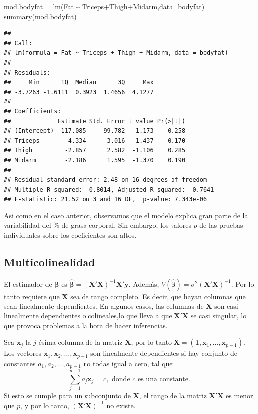 \documentclass[
]{article}
\newenvironment{Shaded}{\begin{snugshade}}{\end{snugshade}}
\newcommand{\AttributeTok}[1]{\textcolor[rgb]{0.77,0.63,0.00}{#1}}
\newcommand{\FunctionTok}[1]{\textcolor[rgb]{0.00,0.00,0.00}{#1}}
\newcommand{\NormalTok}[1]{#1}
\newcommand{\OtherTok}[1]{\textcolor[rgb]{0.56,0.35,0.01}{#1}}
\newcommand{\SpecialCharTok}[1]{\textcolor[rgb]{0.00,0.00,0.00}{#1}}
\begin{document}
\begin{Shaded}
\begin{Highlighting}[]
\NormalTok{mod.bodyfat }\OtherTok{=} \FunctionTok{lm}\NormalTok{(Fat }\SpecialCharTok{\textasciitilde{}}\NormalTok{ Triceps}\SpecialCharTok{+}\NormalTok{Thigh}\SpecialCharTok{+}\NormalTok{Midarm,}\AttributeTok{data=}\NormalTok{bodyfat)}
\FunctionTok{summary}\NormalTok{(mod.bodyfat)}
\end{Highlighting}
\end{Shaded}

\begin{verbatim}
## 
## Call:
## lm(formula = Fat ~ Triceps + Thigh + Midarm, data = bodyfat)
## 
## Residuals:
##     Min      1Q  Median      3Q     Max 
## -3.7263 -1.6111  0.3923  1.4656  4.1277 
## 
## Coefficients:
##             Estimate Std. Error t value Pr(>|t|)
## (Intercept)  117.085     99.782   1.173    0.258
## Triceps        4.334      3.016   1.437    0.170
## Thigh         -2.857      2.582  -1.106    0.285
## Midarm        -2.186      1.595  -1.370    0.190
## 
## Residual standard error: 2.48 on 16 degrees of freedom
## Multiple R-squared:  0.8014, Adjusted R-squared:  0.7641 
## F-statistic: 21.52 on 3 and 16 DF,  p-value: 7.343e-06
\end{verbatim}

Asi como en el caso anterior, observamos que el modelo explica gran parte de la variabilidad del \% de grasa corporal. Sin embargo, los valores \(p\) de las pruebas individuales sobre los coeficientes son altos.

\hypertarget{multicolinealidad-1}{%
\subsection{Multicolinealidad}\label{multicolinealidad-1}}

El estimador de \(\boldsymbol \beta\) es \(\widehat{\boldsymbol \beta}= (\boldsymbol X'\boldsymbol X)^{-1}\boldsymbol X'\boldsymbol y\). Además, \(V(\widehat{\boldsymbol \beta}) = \sigma^{2}(\boldsymbol X'\boldsymbol X)^{-1}\). Por lo tanto requiere que \(\boldsymbol X\) sea de rango completo. Es decir, que hayan columnas que sean linealmente dependientes. En algunos casos, las columnas de \(\boldsymbol X\) son casi linealmente dependientes o colineales,lo que lleva a que \(\boldsymbol X'\boldsymbol X\) se casi singular, lo que provoca problemas a la hora de hacer inferencias.

Sea \(\boldsymbol x_j\) la \(j\)-ésima columna de la matriz \(\boldsymbol X\), por lo tanto \(\boldsymbol X= (\boldsymbol 1,\boldsymbol x_{1},\ldots,\boldsymbol x_{p-1})\). Los vectores \(\boldsymbol x_{1},\boldsymbol x_{2},\ldots,\boldsymbol x_{p-1}\) son linealmente dependientes si hay conjunto de constantes \(a_{1},a_{2},\ldots, a_{p-1}\) no todas igual a cero, tal que:
\[
\sum_{j=1}^{p-1}a_{j}\boldsymbol x_{j} = c, \mbox{ donde }c\mbox{ es una constante.}
\]
Si esto se cumple para un subconjunto de \(\boldsymbol X\), el rango de la matriz \(\boldsymbol X'\boldsymbol X\) es menor que \(p\), y por lo tanto, \((\boldsymbol X'\boldsymbol X)^{-1}\) no existe.
\end{document}
